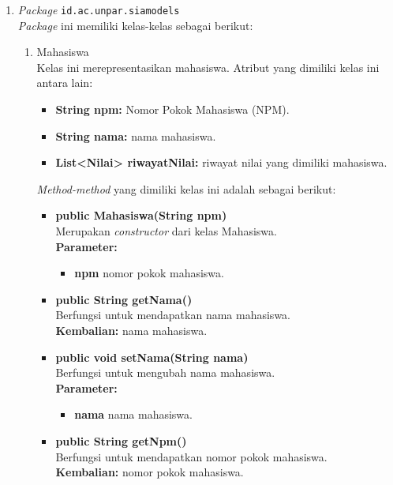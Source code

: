 \begin{enumerate}
	\item \textit{Package} \texttt{id.ac.unpar.siamodels}\\
	\textit{Package} ini memiliki kelas-kelas sebagai berikut:
	\begin{enumerate}
		\item Mahasiswa\\
		Kelas ini merepresentasikan mahasiswa. Atribut yang dimiliki kelas ini antara lain:
		\begin{itemize}
			\item \textbf{String npm:} Nomor Pokok Mahasiswa (NPM).
			\item \textbf{String nama:} nama mahasiswa.
			\item \textbf{List<Nilai> riwayatNilai:} riwayat nilai yang dimiliki mahasiswa.
		\end{itemize}
	\textit{Method-method} yang dimiliki kelas ini adalah sebagai berikut:
		\begin{itemize}
			\item \textbf{public Mahasiswa(String npm)}\\
			Merupakan \textit{constructor} dari kelas Mahasiswa.\\
			\textbf{Parameter:}
			\begin{itemize}
				\item \textbf{npm} nomor pokok mahasiswa.
			\end{itemize}
			
			\item \textbf{public String getNama()}\\
				Berfungsi untuk mendapatkan nama mahasiswa.\\
				\textbf{Kembalian:} nama mahasiswa.

			\item \textbf{public void setNama(String nama)}\\
				Berfungsi untuk mengubah nama mahasiswa.\\
				\textbf{Parameter:}
				\begin{itemize}
					\item \textbf{nama} nama mahasiswa.
				\end{itemize}
		
			\item \textbf{public String getNpm()}\\
				Berfungsi untuk mendapatkan nomor pokok mahasiswa.\\
				\textbf{Kembalian:} nomor pokok mahasiswa.
			

\end{itemize}
\end{enumerate}
\end{enumerate}
